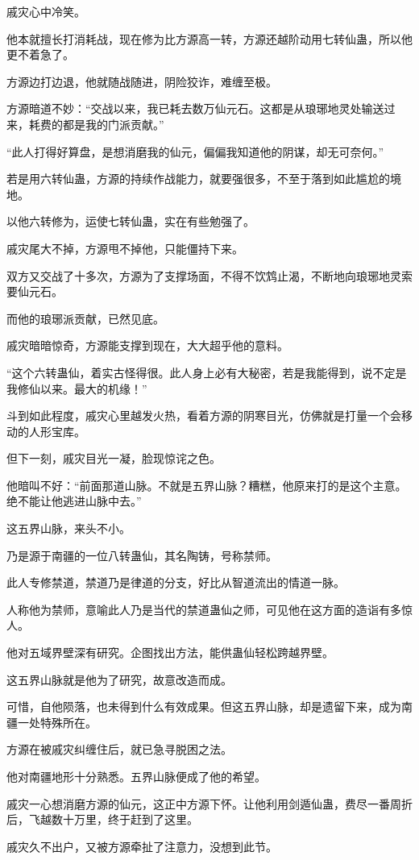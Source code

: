 \begin{this_body}
戚灾心中冷笑。

他本就擅长打消耗战，现在修为比方源高一转，方源还越阶动用七转仙蛊，所以他更不着急了。

方源边打边退，他就随战随进，阴险狡诈，难缠至极。

方源暗道不妙：“交战以来，我已耗去数万仙元石。这都是从琅琊地灵处输送过来，耗费的都是我的门派贡献。”

“此人打得好算盘，是想消磨我的仙元，偏偏我知道他的阴谋，却无可奈何。”

若是用六转仙蛊，方源的持续作战能力，就要强很多，不至于落到如此尴尬的境地。

以他六转修为，运使七转仙蛊，实在有些勉强了。

戚灾尾大不掉，方源甩不掉他，只能僵持下来。

双方又交战了十多次，方源为了支撑场面，不得不饮鸩止渴，不断地向琅琊地灵索要仙元石。

而他的琅琊派贡献，已然见底。

戚灾暗暗惊奇，方源能支撑到现在，大大超乎他的意料。

“这个六转蛊仙，着实古怪得很。此人身上必有大秘密，若是我能得到，说不定是我修仙以来。最大的机缘！”

斗到如此程度，戚灾心里越发火热，看着方源的阴寒目光，仿佛就是打量一个会移动的人形宝库。

但下一刻，戚灾目光一凝，脸现惊诧之色。

他暗叫不好：“前面那道山脉。不就是五界山脉？糟糕，他原来打的是这个主意。绝不能让他逃进山脉中去。”

这五界山脉，来头不小。

乃是源于南疆的一位八转蛊仙，其名陶铸，号称禁师。

此人专修禁道，禁道乃是律道的分支，好比从智道流出的情道一脉。

人称他为禁师，意喻此人乃是当代的禁道蛊仙之师，可见他在这方面的造诣有多惊人。

他对五域界壁深有研究。企图找出方法，能供蛊仙轻松跨越界壁。

这五界山脉就是他为了研究，故意改造而成。

可惜，自他陨落，也未得到什么有效成果。但这五界山脉，却是遗留下来，成为南疆一处特殊所在。

方源在被戚灾纠缠住后，就已急寻脱困之法。

他对南疆地形十分熟悉。五界山脉便成了他的希望。

戚灾一心想消磨方源的仙元，这正中方源下怀。让他利用剑遁仙蛊，费尽一番周折后，飞越数十万里，终于赶到了这里。

戚灾久不出户，又被方源牵扯了注意力，没想到此节。


\end{this_body}
